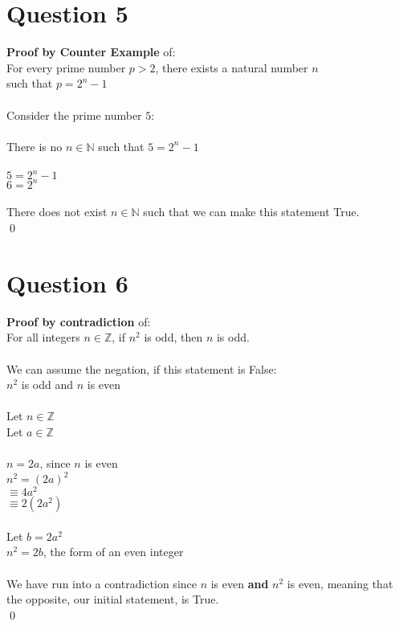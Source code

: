 \documentclass{article}
\begin{document}
    \newpage
    \section*{Question 5}
    \textbf{Proof by Counter Example} of: \\
    \indent For every prime number $p > 2$, there exists a natural number $n$\\ \indent such that $p = 2^n - 1$ \\ \\
    Consider the prime number $5$: \\ \\
    \indent There is no $n \in \mathbb{N}$ such that $5 = 2^n -1$ \\ \\
    \indent $5 = 2^n - 1$ \\
    \indent $6 = 2^n$ \\ \\
    There does not exist $n \in \mathbb{N}$ such that we can make this statement True. \\ \qed
    \newpage
    \section*{Question 6}
    \textbf{Proof by contradiction} of: \\
    \indent For all integers $n \in \mathbb{Z}$, if $n^2$ is odd, then $n$ is odd. \\ \\
    We can assume the negation, if this statement is False:\\
    \indent $n^2$ is odd and $n$ is even \\ \\
    Let $n \in \mathbb{Z}$ \\
    Let $a \in \mathbb{Z}$ \\ \\
    $n = 2a$, since $n$ is even \\
    $n^2 = (2a)^2$ \\
    $\equiv 4a^2$ \\ 
    $\equiv 2(2a^2)$ \\  \\
    Let $b = 2a^2$ \\
    $n^2 = 2b$, the form of an even integer \\ \\
    We have run into a contradiction since $n$ is even \textbf{and} $n^2$ is even, meaning that the opposite, our initial statement, is True. \\ \qed
    
  

   
\end{document}
